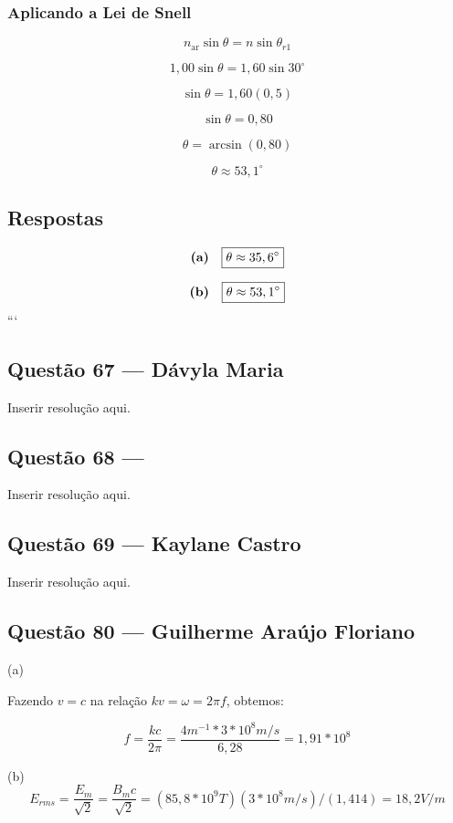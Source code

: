 \documentclass[12pt,a4paper]{article}
\begin{document}
\subsubsection*{Aplicando a Lei de Snell}

\[
n_{\text{ar}}\sin\theta
=
n\sin\theta_{r1}
\]

\[
1,00\sin\theta
=
1,60\sin30^\circ
\]

\[
\sin\theta
=
1,60(0,5)
\]

\[
\sin\theta
=
0,80
\]

\[
\theta
=
\arcsin(0,80)
\]

\[
\theta
\approx 53,1^\circ
\]


\subsection*{Respostas}

\[
\text{\textbf{(a)}} \quad
\boxed{
\theta \approx 35,6^\circ
}
\]

\[
\text{\textbf{(b)}} \quad
\boxed{
\theta \approx 53,1^\circ
}
\]
```

\subsection{Questão 67 — Dávyla Maria}
Inserir resolução aqui.

\subsection{Questão 68 — }
Inserir resolução aqui.

\subsection{Questão 69 — Kaylane Castro}
Inserir resolução aqui.

\subsection{Questão 80 — Guilherme Araújo Floriano}

(a)

Fazendo $v = c$ na relação $kv = \omega = 2\pi f$, obtemos:

\[
f = \frac{kc}{2\pi} = \frac{4 m^{-1}*3*10^8 m/s}{6,28} = 1,91 * 10^8   
\]

(b)
\[
E_{rms} = \frac{E_m}{\sqrt2} = \frac{B_mc}{\sqrt2} = (85,8 * 10^9 T)(3*10^8 m/s)/(1,414) = 18,2 V/m
\]
\end{document}
